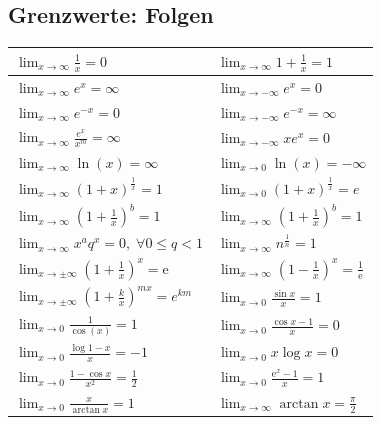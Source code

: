 \subsection{Grenzwerte: Folgen}
\begin{center}
	\begin{tabular}{  l || l  }
                $\lim_{x\to\infty} \frac{1}{x} = 0$ & $\lim_{x\to\infty} 1 + \frac{1}{x} = 1$ \\
		 \hline
                $\lim_{x \to \infty} e^x = \infty$ & $\lim_{x \to - \infty} e^x = 0$ \\
                 \hline
                $\lim_{x \to \infty} e^{-x} = 0$ & $\lim_{x \to - \infty} e^{-x} = \infty$ \\
                 \hline
                $\lim_{x \to \infty} \frac{e^x}{x^m} = \infty$ & $\lim_{x \to - \infty} xe^x = 0$ \\
                 \hline
                $\lim_{x \to \infty} \ln(x) = \infty$ & $\lim_{x \to 0} \ln(x) = - \infty$ \\
                 \hline
                $\lim_{x \to \infty} (1 + x)^{\frac{1}{x}} = 1$ & $\lim_{x \to 0} (1 + x)^{\frac{1}{x}} = e$ \\
                 \hline
	 	$\lim_{x\to\infty} \left(1 + \frac{1}{x}\right)^b = 1$ & $\lim_{x\to\infty} \left(1 + \frac{1}{x}\right)^b = 1$ \\
		 \hline  
	 	$\lim_{x\to\infty} x^aq^x = 0, \; \forall 0 \leq q < 1$ & $\lim_{x\to\infty} n^\frac{1}{n} = 1$ \\
		 \hline
                $\lim_{x\to \pm \infty} \left(1+\frac{1}{x}\right)^x = \mathrm{e}$ & $\lim_{x\to \infty} \left(1-\frac{1}{x}\right)^x = \frac{1}{\mathrm{e}}$ \\
		 \hline
                $\lim_{x \to \pm \infty} \left(1+\frac{k}{x}\right)^{mx} = e^{km}$ & $\lim_{x \to 0} \frac{\sin{x}}{x} = 1$ \\
                 \hline
                $\lim_{x\to 0} \frac{1}{\cos(x)} = 1$ & $\lim_{x\to 0} \frac{\cos{x}-1}{x} = 0$ \\
                 \hline
                $\lim_{x\to 0} \frac{\log{1-x}}{x} = -1$ & $\lim_{x\to 0} x\log{x} = 0$ \\
                 \hline
                $\lim_{x\to 0} \frac{1-\cos{x}}{x^2} = \frac{1}{2}$ & $\lim_{x\to 0} \frac{\mathrm{e}^x-1}{x} = 1$ \\
                 \hline
                $\lim_{x\to 0} \frac{x}{\arctan{x}} = 1$ & $\lim_{x\to\infty} \arctan{x} = \frac{\pi}{2}$ \\

\end{tabular}
\end{center}
